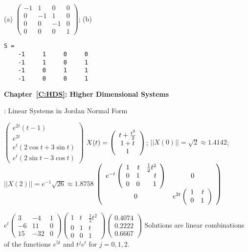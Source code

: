  (a) \ans 
$\left(\begin{array}{rrrr}
-1 &  1 &  0 & 0 \\
0  & -1 &  1 & 0 \\
0  &  0 & -1 & 0 \\
0  &  0 &  0 & 1 \end{array}\right)$;
(b) 
\begin{verbatim}
S =
    -1     1     0     0
    -1     1     0     1
    -1     0     1     1
    -1     0     0     1
\end{verbatim}





\vspace{0.08in}

{\bf Chapter~\ref{C:HDS}: Higher Dimensional Systems}

: Linear Systems in Jordan Normal Form

 \ans $\left(\begin{array}{c}
e^{2t}(t - 1) \\
e^{2t} \\
e^t(2\cos{t} + 3\sin{t}) \\
e^t(2\sin{t} - 3\cos{t})
\end{array}\right)$
$X(t) = \left(\begin{array}{c} t + \frac{t^2}{2} \\ 1 + t \\ 1\end{array}\right)$; 
$||X(0)||=\sqrt{2} \approx 1.4142$; 
$||X(2)|| = e^{-1}\sqrt{26} \approx 1.8758$
  \ans $\left(\begin{array}{cc} e^{-t}\left(\begin{array}{rrr} 
 1 & t & \frac{1}{2}t^2\\ 0 & 1 & t\\ 0 & 0 & 1\end{array}\right) & 0\\ 0 &e^{2t}\left(\begin{array}{rr} 1 & t\\ 0 &1\end{array}\right)\end{array}\right)$

\ans $e^t\left(\begin{array}{rrr}
     3  &  -4   &   1\\
    -6   &  11   &   0\\
    15   & -32   &   0 \end{array}\right)
\left(\begin{array}{rrr}
     1  &  t   &   \frac{1}{2}t^2\\
    0   &  1   &   t\\
    0   &  0   &   1 \end{array}\right)
\left(\begin{array}{r} 0.4074\\ 0.2222\\ 0.6667\end{array}\right)$
 \ans Solutions are linear combinations of the functions 
$e^{5t}$ and $t^je^t$ for $j=0,1,2$.




